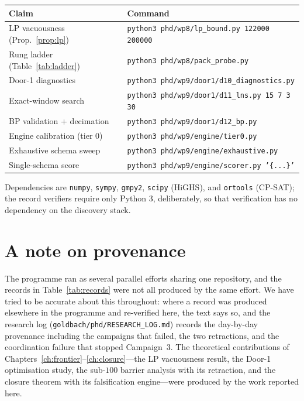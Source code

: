 \begin{center}\small
\begin{tabular}{ll}
\toprule
Claim & Command\\
\midrule
LP vacuousness (Prop.~\ref{prop:lp}) & \texttt{python3 phd/wp8/lp\_bound.py 122000 200000}\\
Rung ladder (Table~\ref{tab:ladder}) & \texttt{python3 phd/wp8/pack\_probe.py}\\
Door-1 diagnostics & \texttt{python3 phd/wp9/door1/d10\_diagnostics.py}\\
Exact-window search & \texttt{python3 phd/wp9/door1/d11\_lns.py 15 7 3 30}\\
BP validation + decimation & \texttt{python3 phd/wp9/door1/d12\_bp.py}\\
Engine calibration (tier 0) & \texttt{python3 phd/wp9/engine/tier0.py}\\
Exhaustive schema sweep & \texttt{python3 phd/wp9/engine/exhaustive.py}\\
Single-schema score & \texttt{python3 phd/wp9/engine/scorer.py '\{...\}'}\\
\bottomrule
\end{tabular}
\end{center}

Dependencies are \texttt{numpy}, \texttt{sympy}, \texttt{gmpy2},
\texttt{scipy} (HiGHS), and \texttt{ortools} (CP-SAT); the record verifiers
require only Python 3, deliberately, so that verification has no dependency on
the discovery stack.

\section{A note on provenance}

The programme ran as several parallel efforts sharing one repository, and the
records in Table~\ref{tab:records} were not all produced by the same effort. We
have tried to be accurate about this throughout: where a record was produced
elsewhere in the programme and re-verified here, the text says so, and the
research log (\texttt{goldbach/phd/RESEARCH\_LOG.md}) records the day-by-day
provenance including the campaigns that failed, the two retractions, and the
coordination failure that stopped Campaign~3. The theoretical contributions of
Chapters~\ref{ch:frontier}--\ref{ch:closure}---the LP vacuousness result, the
Door-1 optimisation study, the sub-$100$ barrier analysis with its retraction,
and the closure theorem with its falsification engine---were produced by the
work reported here.
